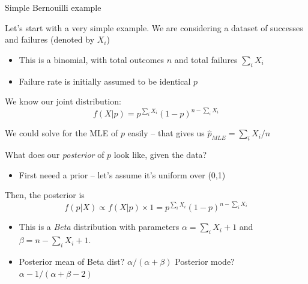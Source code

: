 \documentclass[notes,11pt, aspectratio=169]{beamer}
\newenvironment{wideitemize}{\itemize\addtolength{\itemsep}{10pt}}{\enditemize}
\begin{document}
%
\begin{frame}{Simple Bernouilli example}
  \begin{wideitemize}
  \item Let's start with a very simple example. We are considering a
    dataset of successes and failures (denoted by $X_{i}$)
    \begin{itemize}
    \item This is a binomial, with total outcomes $n$ and total failures
      $\sum_{i}X_{i}$
    \item Failure rate is initially assumed to be identical $p$
    \end{itemize}
  \item We know our joint distribution:
    $$ f(X | p) = p^{\sum_{i}X_{i}}(1-p)^{n - \sum_{i}X_{i}}$$
  \item We could solve for the MLE of $p$ easily -- that gives us
    $\hat{p}_{MLE} = \sum_{i}X_{i} / n$
  \item What does our \emph{posterior} of $p$ look like, given the data?
    \begin{itemize}
    \item First neeed a prior -- let's assume it's uniform over (0,1)
    \end{itemize}
  \item Then, the posterior is
    $$ f(p | X) \propto f(X | p) \times 1  = p^{\sum_{i}X_{i}}(1-p)^{n - \sum_{i}X_{i}}$$
    \begin{itemize}
    \item This is a \emph{Beta} distribution with
      parameters $\alpha = \sum_{i}X_{i} + 1$ and
      $\beta = n - \sum_{i}X_{i} + 1$.
    \item Posterior mean of Beta dist? $\alpha / (\alpha + \beta)$
      Posterior mode? $\alpha - 1 / (\alpha + \beta - 2)$
    \end{itemize}
  \end{wideitemize}
\end{frame}
\end{document}
